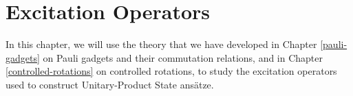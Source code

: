 \chapter{Excitation Operators}%
\label{excitation-operators}

In this chapter, we will use the theory that we have developed in Chapter \ref{pauli-gadgets} on Pauli gadgets and their commutation relations, and in Chapter \ref{controlled-rotations} on controlled rotations, to study the excitation operators used to construct Unitary-Product State ansätze.

